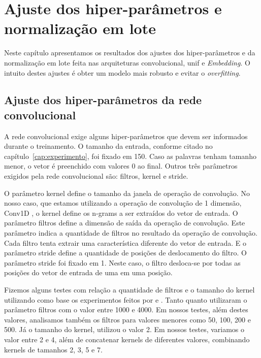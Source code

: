 \chapter{Ajuste dos hiper-parâmetros e normalização em lote}
\label{cap:ajuste-hiper-parametros-cnn}

Neste capítulo apresentamos os resultados dos ajustes dos hiper-parâmetros e da normalização em lote feita nas arquiteturas convolucional, \Gls{unif} e \textit{Embedding}. O intuito destes ajustes é obter um modelo mais robusto e evitar o \textit{overfitting}.

\section{Ajuste dos hiper-parâmetros da rede convolucional}
\label{sec:ajuste-hiper-parametros-cnn}

A rede convolucional exige alguns hiper-parâmetros que devem ser informados durante o treinamento. O tamanho da entrada, conforme citado no capítulo~\ref{cap:experimento}, foi fixado em 150. Caso as palavras tenham tamanho menor, o vetor é preenchido com valores $0$ ao final. Outros três parâmetros exigidos pela rede convolucional são: filtros, kernel e stride.

O parâmetro kernel define o tamanho da janela de operação de convolução. No nosso caso, que estamos utilizando a operação de convolução de 1 dimensão, Conv1D , o kernel define os n-grams a ser extraídos do vetor de entrada. 
O parâmetro filtros define a dimensão de saída da operação de convolução. Este parâmetro indica a quantidade de filtros no resultado da operação de convolução. Cada filtro tenta extrair uma característica diferente do vetor de entrada. E o parâmetro stride define a quantidade de posições de deslocamento do filtro. O parâmetro stride foi fixado em 1. Neste caso, o filtro desloca-se por todas as posições do vetor de entrada de uma em uma posição.

Fizemos alguns testes com relação a quantidade de filtros e o tamanho do kernel utilizando como base os experimentos feitos por \cite{feng-2015} e \cite{tan-lstm-qa}. Tanto \cite{feng-2015} quanto \cite{tan-lstm-qa} utilizaram o parâmetro filtros com o valor entre 1000 e 4000. Em nossos testes, além destes valores, analisamos também os filtros para valores menores como 50, 100, 200 e 500. Já o tamanho do kernel, \cite{tan-lstm-qa} utilizou o valor 2. Em nossos testes, variamos o valor entre 2 e 4, além de concatenar kernels de diferentes valores, combinando kernels de tamanhos 2, 3, 5 e 7.

